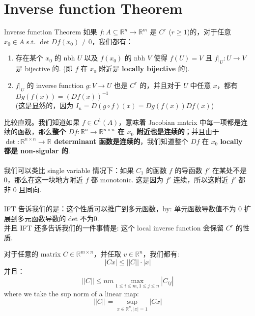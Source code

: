 \section{Inverse function Theorem}
\begin{theorem}{Inverse function Theorem} \label{IFT}
    如果 $f: A \subseteq \mathbb{R}^n \rightarrow \mathbb{R}^m$ 是 $C^r$ 
 ($r \geq 1$)的，对于任意 $x_0 \in A$ s.t. $\det{Df(x_0)} \not= 0$，我们都有：
    \begin{enumerate}
        \item 存在某个 $x_0$ 的 nbh $U$ 以及 $f(x_0)$ 的 nbh $V$ 使得 $f(U) = V$ 且 $f|_U : U \rightarrow V$ 是 bijective 的. (即 $f$ 在 $x_0$ 附近是 \textbf{locally bijective }的).
        \item $f|_U$ 的 inverse function $g: V \rightarrow U$ 也是 $C^r$ 的，并且对于 $U$ 中任意 $x$，都有 $Dg(f(x)) = (Df(x))^{-1}$ \\ 
        (这是显然的，因为 $I_n = D (g \circ f) (x) = Dg(f(x))Df(x)$)
    \end{enumerate}
\end{theorem}
\begin{remark}
    比较直观。我们知道如果 $f \in C^1(A)$，意味着 Jacobian matrix 中每一项都是连续的函数，那么\textbf{整个 $Df: \mathbb{R}^n \rightarrow \mathbb{R}^{n \times n}$ 在 $x_0$ 附近也是连续的}；并且由于 \textbf{$\det :\mathbb{R}^{n \times n} \rightarrow \mathbb{R}$ determinant 函数是连续的}，我们知道整个 $Df$ 在 $x_0$ \textbf{locally 都是 non-sigular 的}. \\\\
    我们可以类比 single variable 情况下：如果 $C_1$ 的函数 $f$ 的导函数 $f'$ 在某处不是 0，那么在这一块地方附近 $f$ 都 monotonic. 这是因为 $f'$ 连续，所以这附近 $f'$ 都非 0 且同向.\\\\
    IFT 告诉我们的是：这个性质可以推广到多元函数，by: 单元函数导数值不为 0 扩展到多元函数导数的 det 不为0.\\
    并且 IFT 还多告诉我们的一件事情是: 这个 local inverse function 会保留 $C^r$ 的性质.\\
\end{remark}

\begin{lemma}
    对于任意的 matrix $C \in \mathbb{R}^{m \times n}$，并任取 $v \in \mathbb{R}^n$，我们都有:
    $$
    |Cx| \leq ||C|| \cdot |x|
    $$
    并且： 
    $$
||C||\leq nm \max_{1 \leq i \leq m, 1\leq j \leq n} |C_{ij}|
$$
where we take the sup norm of a linear map:
$$
||C|| = \sup_{x \in \mathbb{R}^n, |x| = 1} |Cx|
$$
\end{lemma}


